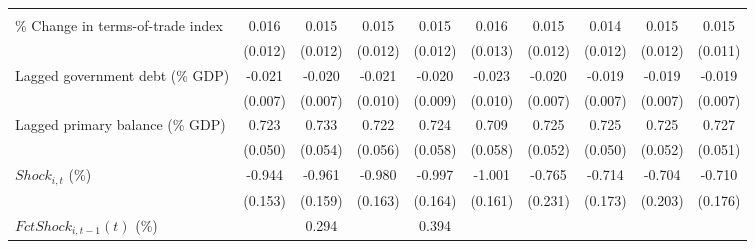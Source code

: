{\begin{tabular}{l*{9}{c}}
                    &                     &                     &                     &                     &                     &                     &                     &                     &                     \\
\addlinespace
\% Change in terms-of-trade index&       0.016         &       0.015         &       0.015         &       0.015         &       0.016         &       0.015         &       0.014         &       0.015         &       0.015         \\
                    &     (0.012)         &     (0.012)         &     (0.012)         &     (0.012)         &     (0.013)         &     (0.012)         &     (0.012)         &     (0.012)         &     (0.011)         \\
\addlinespace
Lagged government debt (\% GDP)&      -0.021\sym{***}&      -0.020\sym{**} &      -0.021\sym{**} &      -0.020\sym{**} &      -0.023\sym{**} &      -0.020\sym{**} &      -0.019\sym{**} &      -0.019\sym{**} &      -0.019\sym{**} \\
                    &     (0.007)         &     (0.007)         &     (0.010)         &     (0.009)         &     (0.010)         &     (0.007)         &     (0.007)         &     (0.007)         &     (0.007)         \\
\addlinespace
Lagged primary balance (\% GDP)&       0.723\sym{***}&       0.733\sym{***}&       0.722\sym{***}&       0.724\sym{***}&       0.709\sym{***}&       0.725\sym{***}&       0.725\sym{***}&       0.725\sym{***}&       0.727\sym{***}\\
                    &     (0.050)         &     (0.054)         &     (0.056)         &     (0.058)         &     (0.058)         &     (0.052)         &     (0.050)         &     (0.052)         &     (0.051)         \\
\addlinespace
$ Shock_{i,t}$ (\%) &      -0.944\sym{***}&      -0.961\sym{***}&      -0.980\sym{***}&      -0.997\sym{***}&      -1.001\sym{***}&      -0.765\sym{***}&      -0.714\sym{***}&      -0.704\sym{***}&      -0.710\sym{***}\\
                    &     (0.153)         &     (0.159)         &     (0.163)         &     (0.164)         &     (0.161)         &     (0.231)         &     (0.173)         &     (0.203)         &     (0.176)         \\
\addlinespace
$ FctShock_{i,t-1}(t)$ (\%)&                     &       0.294         &                     &       0.394         &                     &                     &                     &                     &                     \\

\end{tabular}}
